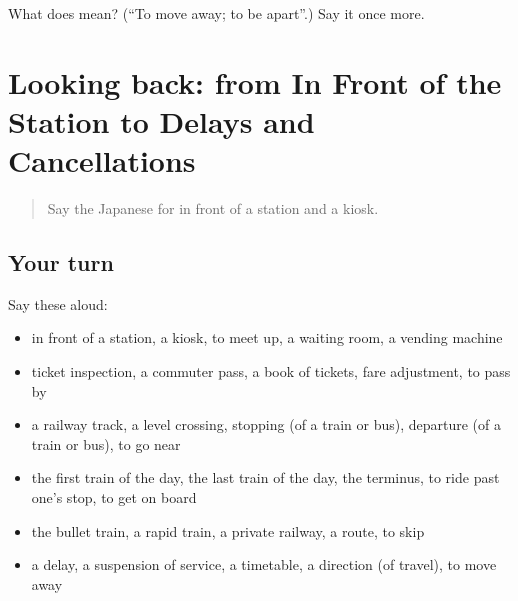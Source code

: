 \begin{tcolorbox}[breakable,colback=teal!4,colframe=teal!35!black,title={Before you move on}]
What does  mean? (\textquotedblleft{}To move away; to be apart\textquotedblright{}.) Say it once more.
\end{tcolorbox}
\section[(dialogue)]{Looking back: from In Front of the Station to Delays and Cancellations}

\label{lesson:JA-R377-review-372-377}



\begin{quote}
Say the Japanese for in front of a station and a kiosk.
\end{quote}

\subsection*{Your turn}
Say these aloud:

\begin{itemize}
\raggedright
  \item in front of a station, a kiosk, to meet up, a waiting room, a vending machine
  \item ticket inspection, a commuter pass, a book of tickets, fare adjustment, to pass by
  \item a railway track, a level crossing, stopping (of a train or bus), departure (of a train or bus), to go near
  \item the first train of the day, the last train of the day, the terminus, to ride past one's stop, to get on board
  \item the bullet train, a rapid train, a private railway, a route, to skip
  \item a delay, a suspension of service, a timetable, a direction (of travel), to move away
\end{itemize}

